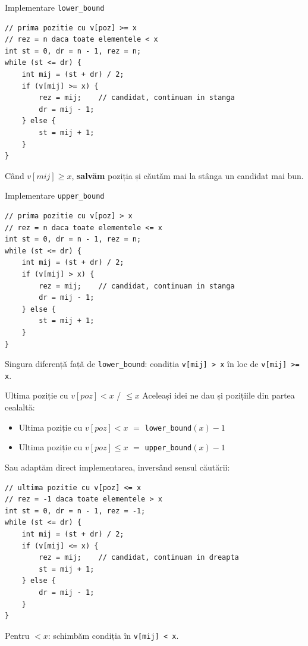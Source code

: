 \documentclass{beamer}
\begin{document}
\begin{frame}[fragile]{Implementare \texttt{lower\_bound}}
  \begin{lstlisting}
// prima pozitie cu v[poz] >= x
// rez = n daca toate elementele < x
int st = 0, dr = n - 1, rez = n;
while (st <= dr) {
    int mij = (st + dr) / 2;
    if (v[mij] >= x) {
        rez = mij;    // candidat, continuam in stanga
        dr = mij - 1;
    } else {
        st = mij + 1;
    }
}
  \end{lstlisting}
  Când $v[mij] \geq x$, \textbf{salvăm} poziția și căutăm mai la stânga un candidat mai bun.
\end{frame}

\begin{frame}[fragile]{Implementare \texttt{upper\_bound}}
  \begin{lstlisting}
// prima pozitie cu v[poz] > x
// rez = n daca toate elementele <= x
int st = 0, dr = n - 1, rez = n;
while (st <= dr) {
    int mij = (st + dr) / 2;
    if (v[mij] > x) {
        rez = mij;    // candidat, continuam in stanga
        dr = mij - 1;
    } else {
        st = mij + 1;
    }
}
  \end{lstlisting}
  Singura diferență față de \texttt{lower\_bound}: condiția \lstinline|v[mij] > x| în loc de \lstinline|v[mij] >= x|.
\end{frame}

\begin{frame}{Ultima poziție cu $v[poz] < x$ / $\leq x$}
  Aceleași idei ne dau și pozițiile din partea cealaltă:
  \begin{itemize}
    \item Ultima poziție cu $v[poz] < x$ $=$ \texttt{lower\_bound}$(x) - 1$
    \item Ultima poziție cu $v[poz] \leq x$ $=$ \texttt{upper\_bound}$(x) - 1$
  \end{itemize}
  Sau adaptăm direct implementarea, inversând sensul căutării:
  \begin{lstlisting}
// ultima pozitie cu v[poz] <= x
// rez = -1 daca toate elementele > x
int st = 0, dr = n - 1, rez = -1;
while (st <= dr) {
    int mij = (st + dr) / 2;
    if (v[mij] <= x) {
        rez = mij;    // candidat, continuam in dreapta
        st = mij + 1;
    } else {
        dr = mij - 1;
    }
}
  \end{lstlisting}
  Pentru $< x$: schimbăm condiția în \lstinline|v[mij] < x|.
\end{frame}

\end{document}
